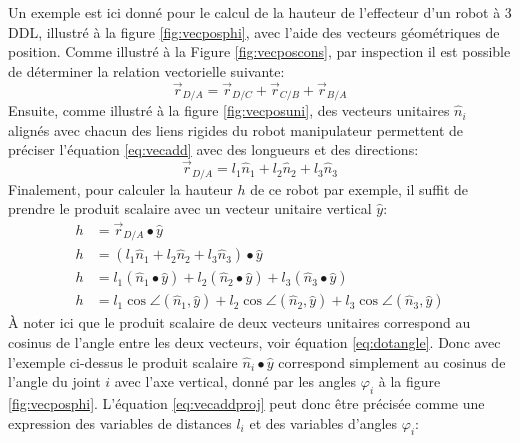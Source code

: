 

\begin{example}
\label{sec:hauteurrobot}

Un exemple est ici donné pour le calcul de la hauteur de l'effecteur d'un robot à 3 DDL, illustré à la figure \ref{fig:vecposphi}, avec l'aide des vecteurs géométriques de position. Comme illustré à la Figure \ref{fig:vecposcons}, par inspection il est possible de déterminer la relation vectorielle suivante:
\begin{equation}
\vec{r}_{D/A} = \vec{r}_{D/C} + \vec{r}_{C/B} + \vec{r}_{B/A}
\label{eq:vecadd}
\end{equation} 
Ensuite, comme illustré à la figure \ref{fig:vecposuni}, des vecteurs unitaires $\hat{n}_i$ alignés avec chacun des liens rigides du robot manipulateur permettent de préciser l'équation \eqref{eq:vecadd} avec des longueurs et des directions:
\begin{equation}
\vec{r}_{D/A} = l_1 \hat{n}_{1} + l_2 \hat{n}_{2} + l_3 \hat{n}_{3}
\label{eq:vecadduni}
\end{equation} 
Finalement, pour calculer la hauteur $h$ de ce robot par exemple, il suffit de prendre le produit scalaire avec un vecteur unitaire vertical $\hat{y}$:
\begin{align}
h &= \vec{r}_{D/A} \bullet \hat{y} \\
h &= ( l_1 \hat{n}_{1} + l_2 \hat{n}_{2} + l_3 \hat{n}_{3} ) \bullet \hat{y} \\
h &= l_1 ( \hat{n}_{1} \bullet \hat{y} ) + l_2 ( \hat{n}_{2} \bullet \hat{y} ) + l_3 ( \hat{n}_{3}  \bullet \hat{y} ) \\
h &= l_1 \cos \angle (\hat{n}_{1},\hat{y}) + l_2 \cos \angle (\hat{n}_{2},\hat{y}) + l_3 \cos \angle (\hat{n}_{3},\hat{y})
\label{eq:vecaddproj}
\end{align} 
À noter ici que le produit scalaire de deux vecteurs unitaires correspond au cosinus de l'angle entre les deux vecteurs, voir équation \eqref{eq:dotangle}. Donc avec l’exemple ci-dessus le produit scalaire $\hat{n}_{i} \bullet \hat{y}$ correspond simplement au cosinus de l'angle du joint $i$ avec l'axe vertical, donné par les angles $\varphi_i$ à la figure \ref{fig:vecposphi}. L'équation \eqref{eq:vecaddproj} peut donc être précisée comme une expression des variables de distances $l_i$ et des variables d'angles $\varphi_i$: 

\end{example}
